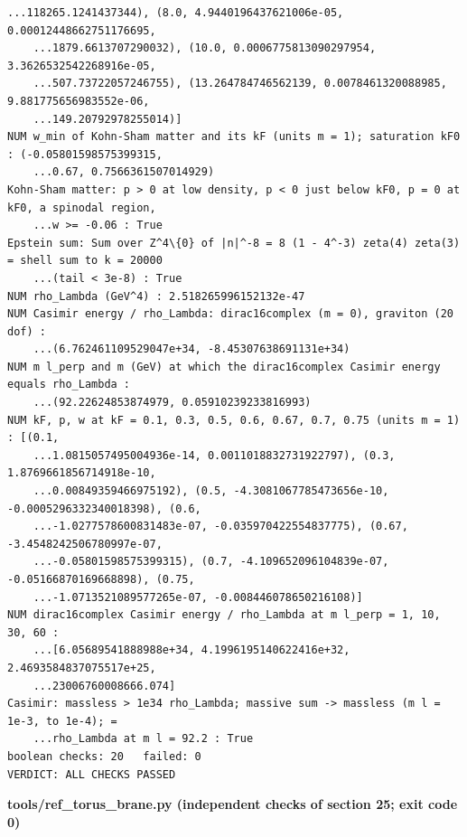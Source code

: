 \documentclass[10pt,a4paper]{article}
\begin{document}
\begin{Verbatim}[fontsize=\small,frame=single,framesep=2mm]
    ...118265.1241437344), (8.0, 4.9440196437621006e-05, 0.00012448662751176695,
    ...1879.6613707290032), (10.0, 0.0006775813090297954, 3.3626532542268916e-05,
    ...507.73722057246755), (13.264784746562139, 0.0078461320088985, 9.881775656983552e-06,
    ...149.20792978255014)]
NUM w_min of Kohn-Sham matter and its kF (units m = 1); saturation kF0 : (-0.05801598575399315,
    ...0.67, 0.7566361507014929)
Kohn-Sham matter: p > 0 at low density, p < 0 just below kF0, p = 0 at kF0, a spinodal region,
    ...w >= -0.06 : True
Epstein sum: Sum over Z^4\{0} of |n|^-8 = 8 (1 - 4^-3) zeta(4) zeta(3) = shell sum to k = 20000
    ...(tail < 3e-8) : True
NUM rho_Lambda (GeV^4) : 2.518265996152132e-47
NUM Casimir energy / rho_Lambda: dirac16complex (m = 0), graviton (20 dof) :
    ...(6.762461109529047e+34, -8.45307638691131e+34)
NUM m l_perp and m (GeV) at which the dirac16complex Casimir energy equals rho_Lambda :
    ...(92.22624853874979, 0.05910239233816993)
NUM kF, p, w at kF = 0.1, 0.3, 0.5, 0.6, 0.67, 0.7, 0.75 (units m = 1) : [(0.1,
    ...1.0815057495004936e-14, 0.0011018832731922797), (0.3, 1.8769661856714918e-10,
    ...0.00849359466975192), (0.5, -4.3081067785473656e-10, -0.0005296332340018398), (0.6,
    ...-1.0277578600831483e-07, -0.035970422554837775), (0.67, -3.4548242506780997e-07,
    ...-0.05801598575399315), (0.7, -4.109652096104839e-07, -0.05166870169668898), (0.75,
    ...-1.0713521089577265e-07, -0.008446078650216108)]
NUM dirac16complex Casimir energy / rho_Lambda at m l_perp = 1, 10, 30, 60 :
    ...[6.05689541888988e+34, 4.1996195140622416e+32, 2.4693584837075517e+25,
    ...23006760008666.074]
Casimir: massless > 1e34 rho_Lambda; massive sum -> massless (m l = 1e-3, to 1e-4); =
    ...rho_Lambda at m l = 92.2 : True
boolean checks: 20   failed: 0
VERDICT: ALL CHECKS PASSED
\end{Verbatim}
\textbf{tools/ref\_torus\_brane.py (independent checks of section 25; exit code 0)}
\end{document}
